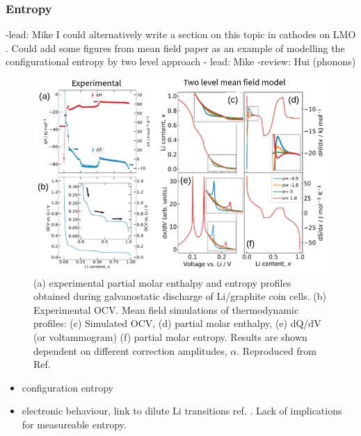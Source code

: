 \documentclass[journal=jacsat,manuscript=article]{achemso}
\begin{document}
\subsubsection{Entropy}
\label{sec:anodes_entropy}
-lead: Mike
I could alternatively write a section on this topic in cathodes on LMO .
Could add some figures from mean field paper  as an example of modelling the configurational entropy by two level approach
- lead: Mike
-review: Hui (phonons)

    \begin{figure}
    \centering
    \includegraphics[scale=2]{figures/graphite_meanfield_alpha.png}
    \caption{(a) experimental partial molar enthalpy and entropy profiles obtained during galvanostatic discharge of Li/graphite coin cells. (b) Experimental OCV. Mean field simulations of thermodynamic profiles: (c) Simulated OCV, (d) partial molar enthalpy, (e) dQ/dV (or voltammogram) (f) partial molar entropy. Results are shown dependent on different correction amplitudes, $\alpha$.  Reproduced from Ref. }
    \label{fig:graphite_meanfield}
\end{figure}
\begin{itemize}
    \item configuration entropy
    \item electronic behaviour, link to dilute Li transitions ref. . Lack of implications for measureable entropy.
\end{itemize}

\end{document}
